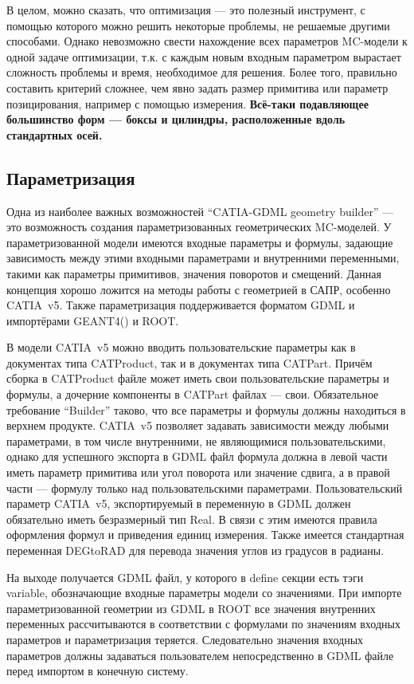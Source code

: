В целом, можно сказать, что оптимизация --- это полезный инструмент, с помощью которого можно решить некоторые проблемы, не решаемые другими способами. Однако невозможно свести нахождение всех параметров MC-модели к одной задаче оптимизации, т.к. с каждым новым входным параметром вырастает сложность проблемы и время, необходимое для решения. Более того, правильно составить критерий сложнее, чем явно задать размер примитива или параметр позицирования, например с помощью измерения. \textbf{Всё-таки подавляющее большинство форм --- боксы и цилиндры, расположенные вдоль стандартных осей.}

\subsection{Параметризация}\label{sec:Parameterization}

Одна из наиболее важных возможностей ``CATIA-GDML geometry builder'' --- это возможность создания параметризованных геометрических MC-моделей. У параметризованной модели имеются входные параметры и формулы, задающие зависимость между этими входными параметрами и внутренними переменными, такими как параметры примитивов, значения поворотов и смещений. Данная концепция хорошо ложится на методы работы с геометрией в САПР, особенно CATIA~v5. Также параметризация поддерживается форматом GDML и импортёрами GEANT4(\todo) и ROOT.

В модели CATIA~v5 можно вводить пользовательские параметры как в документах типа CATProduct, так и в документах типа CATPart. Причём сборка в CATProduct файле может иметь свои пользовательские параметры и формулы, а дочерние компоненты в CATPart файлах --- свои. Обязательное требование ``Builder'' таково, что все параметры и формулы должны находиться в верхнем продукте. CATIA~v5 позволяет задавать зависимости между любыми параметрами, в том числе внутренними, не являющимися пользовательскими, однако для успешного экспорта в GDML файл формула должна в левой части иметь параметр примитива или угол поворота или значение сдвига, а в правой части --- формулу только над пользовательскими параметрами. Пользовательский параметр CATIA~v5, экспортируемый в переменную в GDML должен обязательно иметь безразмерный тип Real. В связи с этим имеются правила оформления формул и приведения единиц измерения. Также имеется стандартная переменная DEGtoRAD для перевода значения углов из градусов в радианы.

На выходе получается GDML файл, у которого в define секции есть тэги variable, обозначающие входные параметры модели со значениями. При импорте параметризованной геометрии из GDML в ROOT все значения внутренних переменных рассчитываются в соответствии с формулами по значениям входных параметров и параметризация теряется. Следовательно значения входных параметров должны задаваться пользователем непосредственно в GDML файле перед импортом в конечную систему.

